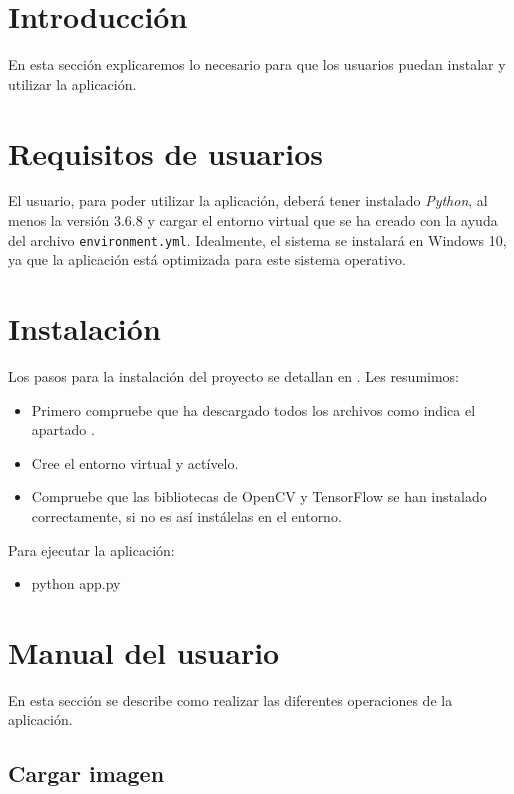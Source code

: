 
\section{Introducción}

En esta sección explicaremos lo necesario para que los usuarios puedan instalar y utilizar la aplicación.

\section{Requisitos de usuarios}

El usuario, para poder utilizar la aplicación, deberá tener instalado \textit{Python}, al menos la versión 3.6.8 y cargar el entorno virtual que se ha creado con la ayuda del archivo \texttt{environment.yml}. Idealmente, el sistema se instalará en Windows 10, ya que la aplicación está optimizada para este sistema operativo.

\section{Instalación}

Los pasos para la instalación del proyecto se detallan en . Les resumimos:

\begin{itemize}
    \item Primero compruebe que ha descargado todos los archivos como indica el apartado \label{descargar}.
    \item Cree el entorno virtual y actívelo.
    \item Compruebe que las bibliotecas de OpenCV y TensorFlow se han instalado correctamente, si no es así instálelas en el entorno.
\end{itemize}

Para ejecutar la aplicación:
\begin{itemize}
    \item python app.py
\end{itemize}

\section{Manual del usuario}

En esta sección se describe como realizar las diferentes operaciones de la aplicación.

\subsection{Cargar imagen}

